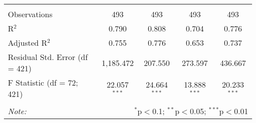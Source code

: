 \begin{table}[!htbp]
\begin{tabular}{@{\extracolsep{5pt}}lcccc}
  & & & & \\ 
\hline \\[-1.8ex] 
Observations & 493 & 493 & 493 & 493 \\ 
R$^{2}$ & 0.790 & 0.808 & 0.704 & 0.776 \\ 
Adjusted R$^{2}$ & 0.755 & 0.776 & 0.653 & 0.737 \\ 
Residual Std. Error (df = 421) & 1,185.472 & 207.550 & 273.597 & 436.667 \\ 
F Statistic (df = 72; 421) & 22.057$^{***}$ & 24.664$^{***}$ & 13.888$^{***}$ & 20.233$^{***}$ \\ 
\hline 
\hline \\[-1.8ex] 
\textit{Note:}  & \multicolumn{4}{r}{$^{*}$p$<$0.1; $^{**}$p$<$0.05; $^{***}$p$<$0.01} \\ 
\end{tabular} 
\end{table} 
